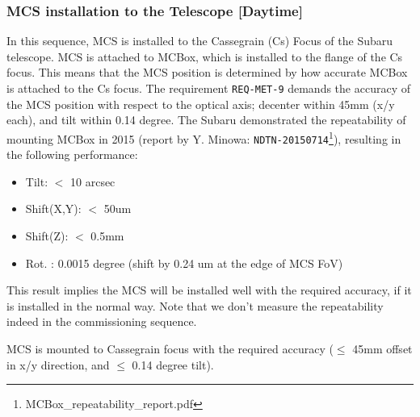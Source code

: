 \subsubsection{MCS installation to the Telescope [Daytime]}\label{secflow:MCSinstall}
In this sequence, MCS is installed to the Cassegrain (Cs) Focus of the Subaru telescope.
MCS is attached to MCBox, which is installed to the flange of the Cs focus. 
This means that the MCS position is determined by how accurate MCBox is attached to the Cs focus.
The requirement {\tt REQ-MET-9} demands the accuracy of the MCS position with respect to the optical axis; decenter within 45mm (x/y each), and tilt within 0.14 degree.
The Subaru demonstrated the repeatability of mounting MCBox in 2015 (report by Y. Minowa: {\tt NDTN-20150714}\footnote{MCBox\_repeatability\_report.pdf}), resulting in the following performance:
\begin{itemize}
\item Tilt: $<$ 10 arcsec
\item Shift(X,Y): $<$ 50um
\item Shift(Z): $<$ 0.5mm
\item Rot. : 0.0015 degree (shift by 0.24 um at the edge of MCS FoV)
\end{itemize}
This result implies the MCS will be installed well with the required accuracy, if it is installed in the normal way.
Note that we don't measure the repeatability indeed in the commissioning sequence.





\begin{itembox}[l]{}
MCS is mounted to Cassegrain focus with the required accuracy ($\leq$ 45mm offset in x/y direction, and $\leq$ 0.14 degree tilt). 

\end{itembox}